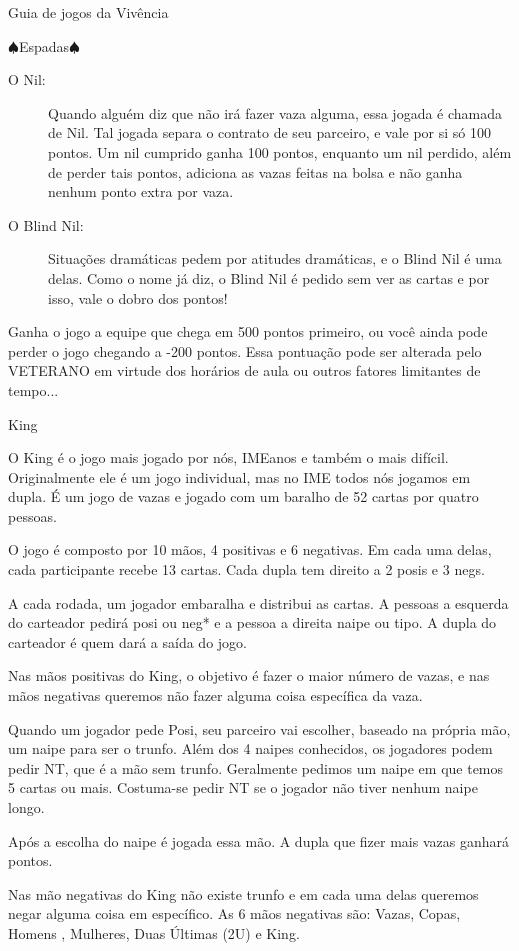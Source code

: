 \begin{secao}{Guia de jogos da Vivência }
\begin{subsecao}{$\spadesuit$Espadas$\spadesuit$}
\begin{description}
\item[O Nil:]
Quando alguém diz que não irá fazer vaza alguma, essa jogada é chamada de Nil. Tal jogada separa o contrato de seu parceiro, e vale por si só 100 pontos. Um nil cumprido ganha 100 pontos, enquanto um nil perdido, além de perder tais pontos, adiciona as vazas feitas na bolsa e não ganha nenhum ponto extra por vaza.

\item[O Blind Nil:]
Situações dramáticas pedem por atitudes dramáticas, e o Blind Nil é uma delas. Como o nome já diz, o Blind Nil é pedido sem ver as cartas e por isso, vale o dobro dos pontos!

\end{description}
Ganha o jogo a equipe que chega em 500 pontos primeiro, ou você ainda pode perder o jogo chegando a -200 pontos. Essa pontuação pode ser alterada pelo VETERANO em virtude dos horários de aula ou outros fatores limitantes de tempo...


\end{subsecao}
\begin{subsecao}{King}

O King é o jogo mais jogado por nós, IMEanos e também o mais difícil. Originalmente ele é um jogo individual, mas no IME todos nós jogamos em dupla. É um jogo de vazas e jogado com um baralho de 52 cartas por quatro pessoas.

O jogo é composto por 10 mãos, 4 positivas e 6 negativas. Em cada uma delas, cada participante recebe 13 cartas. Cada dupla tem direito a 2 posis e 3 negs.

A cada rodada, um jogador embaralha e distribui as cartas. A pessoas a esquerda do carteador pedirá posi ou neg* e a pessoa a direita naipe ou tipo. A dupla do carteador é quem dará a saída do jogo.

Nas mãos positivas do King, o objetivo é fazer o maior número de vazas, e nas mãos negativas queremos não fazer alguma coisa específica da vaza.

Quando um jogador pede Posi, seu parceiro vai escolher, baseado na própria mão, um naipe para ser o trunfo. Além dos 4 naipes conhecidos,  os jogadores podem pedir NT, que é a mão sem trunfo. Geralmente pedimos um naipe em que temos 5 cartas ou mais. Costuma-se pedir NT se o jogador não tiver nenhum naipe longo.

Após a escolha do naipe é jogada essa mão. A dupla que fizer mais vazas ganhará pontos.

Nas mão negativas do King não existe trunfo e em cada uma delas queremos negar alguma coisa em específico. As 6 mãos negativas são: Vazas, Copas, Homens , Mulheres, Duas Últimas (2U) e King.


\end{subsecao}
\end{secao}
